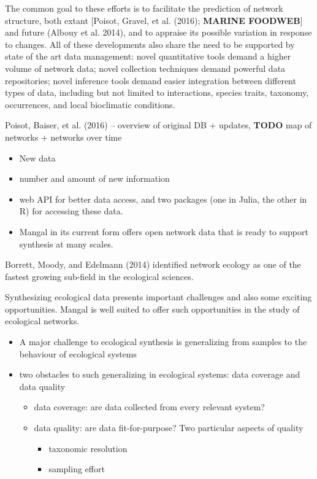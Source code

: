 The common goal to these efforts is to facilitate the prediction of
network structure, both extant {[}Poisot, Gravel, et al. (2016);
\textbf{MARINE FOODWEB}{]} and future (Albouy et al. 2014), and to
appraise its possible variation in response to changes. All of these
developments also share the need to be supported by state of the art
data management: novel quantitative tools demand a higher volume of
network data; novel collection techniques demand powerful data
repositories; novel inference tools demand easier integration between
different types of data, including but not limited to interactions,
species traits, taxonomy, occurrences, and local bioclimatic conditions.

Poisot, Baiser, et al. (2016) -- overview of original DB + updates,
\textbf{TODO} map of networks + networks over time

\begin{itemize}
\tightlist
\item
  New data
\item
  number and amount of new information
\item
  web API for better data access, and two packages (one in Julia, the
  other in R) for accessing these data.
\item
  Mangal in its current form offers open network data that is ready to
  support synthesis at many scales.
\end{itemize}

Borrett, Moody, and Edelmann (2014) identified network ecology as one of
the fastest growing sub-field in the ecological sciences.

Synthesizing ecological data presents important challenges and also some
exciting opportunities. Mangal is well suited to offer such
opportunities in the study of ecological networks.

\begin{itemize}
\tightlist
\item
  A major challenge to ecological synthesis is generalizing from samples
  to the behaviour of ecological systems
\item
  two obstacles to such generalizing in ecological systems: data
  coverage and data quality

  \begin{itemize}
  \tightlist
  \item
    data coverage: are data collected from every relevant system?
  \item
    data quality: are data fit-for-purpose? Two particular aspects of
    quality

    \begin{itemize}
    \tightlist
    \item
      taxonomic resolution
    \item
      sampling effort
    \end{itemize}
  \end{itemize}
\end{itemize}

